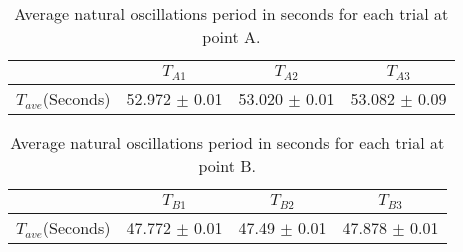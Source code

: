 \begin{table}[h]
\begin{center}
\begin{tabular}{c|c|c|c|}
\cline{2-4}
 & $T_{A1}$ & $T_{A2}$ & $T_{A3}$ \\ \hline
\multicolumn{1}{|c|}{$T_{ave}$(Seconds)} & {\color[HTML]{000000} 52.972 $\pm$ 0.01} & {\color[HTML]{000000} 53.020 $\pm$ 0.01} & {\color[HTML]{000000} 53.082 $\pm$ 0.09} \\ \hline
\end{tabular}
\caption{Average natural oscillations period in seconds for each trial at point A.}
\label{tab:3}
\end{center}
\end{table}

\begin{table}[h]
\begin{center}
\begin{tabular}{c|c|c|c|}
\cline{2-4}
 & $T_{B1}$ & $T_{B2}$ & $T_{B3}$ \\ \hline
\multicolumn{1}{|c|}{$T_{ave}$(Seconds)} & {\color[HTML]{000000} 47.772 $\pm$ 0.01} & {\color[HTML]{000000} 47.49 $\pm$ 0.01} & {\color[HTML]{000000} 47.878 $\pm$ 0.01} \\ \hline
\end{tabular}
\caption{Average natural oscillations period in seconds for each trial at point B.}
\label{tab:4}
\end{center}
\end{table}